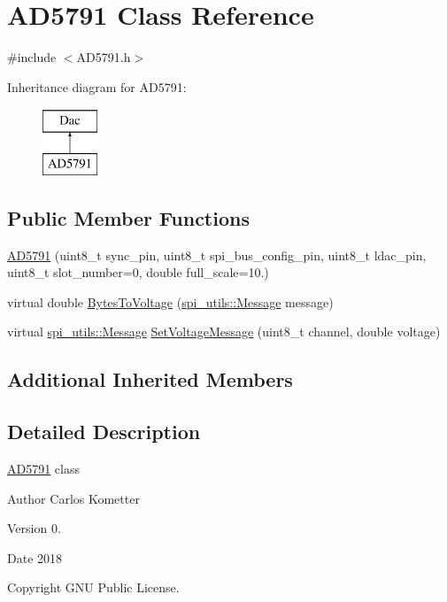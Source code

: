 \hypertarget{classAD5791}{}\section{A\+D5791 Class Reference}
\label{classAD5791}


{\ttfamily \#include $<$A\+D5791.\+h$>$}

Inheritance diagram for A\+D5791\+:\begin{figure}[H]
\begin{center}
\leavevmode
\includegraphics[height=2.000000cm]{classAD5791}
\end{center}
\end{figure}
\subsection*{Public Member Functions}
\begin{DoxyCompactItemize}
\item 
\mbox{\hyperlink{classAD5791_ac7e74d16f21a12a552ecf76cf50e46d2}{A\+D5791}} (uint8\+\_\+t sync\+\_\+pin, uint8\+\_\+t spi\+\_\+bus\+\_\+config\+\_\+pin, uint8\+\_\+t ldac\+\_\+pin, uint8\+\_\+t slot\+\_\+number=0, double full\+\_\+scale=10.)
\item 
virtual double \mbox{\hyperlink{classAD5791_ab1f3eef8afe6989d9981bb29ddec9ec5}{Bytes\+To\+Voltage}} (\mbox{\hyperlink{structspi__utils_1_1Message}{spi\+\_\+utils\+::\+Message}} message)
\item 
virtual \mbox{\hyperlink{structspi__utils_1_1Message}{spi\+\_\+utils\+::\+Message}} \mbox{\hyperlink{classAD5791_af2d4276c910abe162aab867b9f86aa5f}{Set\+Voltage\+Message}} (uint8\+\_\+t channel, double voltage)
\end{DoxyCompactItemize}
\subsection*{Additional Inherited Members}


\subsection{Detailed Description}
\mbox{\hyperlink{classAD5791}{A\+D5791}} class \begin{DoxyAuthor}{Author}
Carlos Kometter 
\end{DoxyAuthor}
\begin{DoxyVersion}{Version}
0. 
\end{DoxyVersion}
\begin{DoxyDate}{Date}
2018 
\end{DoxyDate}
\begin{DoxyCopyright}{Copyright}
G\+NU Public License. 
\end{DoxyCopyright}


